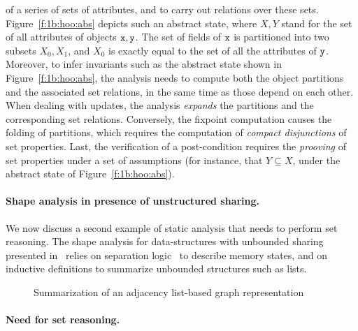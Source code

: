 of a series of sets of attributes, and to carry out relations over these
sets.
Figure~\ref{f:1b:hoo:abs} depicts such an abstract state, where \( X, Y \)
stand for the set of all attributes of objects \( \mathtt{x}, \mathtt{y} \).
The set of fields of \( \mathtt{x} \) is partitioned into two subsets \( X_0,
X_1 \), and \( X_0 \) is exactly equal to the set of all the attributes
of \( \mathtt{y} \).
Moreover, to infer invariants such as the abstract state shown in
Figure~\ref{f:1b:hoo:abs}, the analysis needs to compute both the
object partitions and the associated set relations, in the same time
as those depend on each other.
When dealing with updates, the analysis {\em expands} the partitions and the
corresponding set relations.
Conversely, the fixpoint computation causes the folding of partitions,
which requires the computation of {\em compact disjunctions} of set
properties.
Last, the verification of a post-condition requires the {\em prooving}
of set properties under a set of assumptions (for instance, that \( Y
\subseteq X \), under the abstract state of Figure~\ref{f:1b:hoo:abs}).

\paragraph{Shape analysis in presence of unstructured sharing.}
We now discuss a second example of static analysis that needs to perform
set reasoning.
The shape analysis for data-structures with unbounded sharing presented
in~\cite{memcad:15:sas} relies on separation logic~\cite{r:lics:02} to
describe memory states, and on inductive definitions to summarize
unbounded structures such as lists.
\begin{figure}[t]
  \newcommand{\picscale}{1}
  \begin{center}
    \subfigure[A concrete state]{
      \tikzpics{\picscale}{memcad-conc}
    }
    \quad
  \end{center}
  \caption{Summarization of an adjacency list-based graph representation}
  \label{f:2:memcad}
\end{figure}

\paragraph{Need for set reasoning.}
